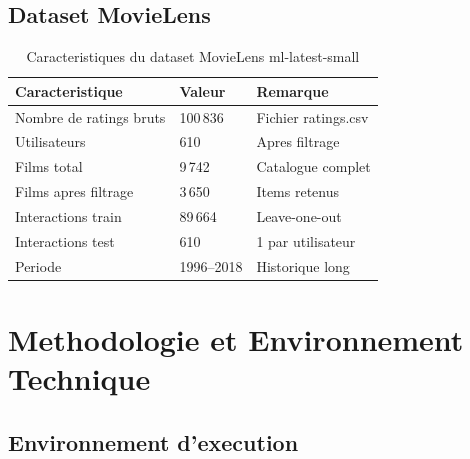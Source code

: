 \documentclass[12pt,a4paper]{report}
\begin{document}
\section{Dataset MovieLens}

\begin{table}[H]
\centering
\caption{Caracteristiques du dataset MovieLens ml-latest-small}
\begin{tabular}{lll}
\toprule
\textbf{Caracteristique} & \textbf{Valeur} & \textbf{Remarque} \\
\midrule
Nombre de ratings bruts & 100\,836 & Fichier ratings.csv \\
Utilisateurs & 610 & Apres filtrage \\
Films total & 9\,742 & Catalogue complet \\
Films apres filtrage & 3\,650 & Items retenus \\
Interactions train & 89\,664 & Leave-one-out \\
Interactions test & 610 & 1 par utilisateur \\
Periode & 1996--2018 & Historique long \\
\bottomrule
\end{tabular}
\end{table}

\chapter{Methodologie et Environnement Technique}

\section{Environnement d'execution}
\end{document}
